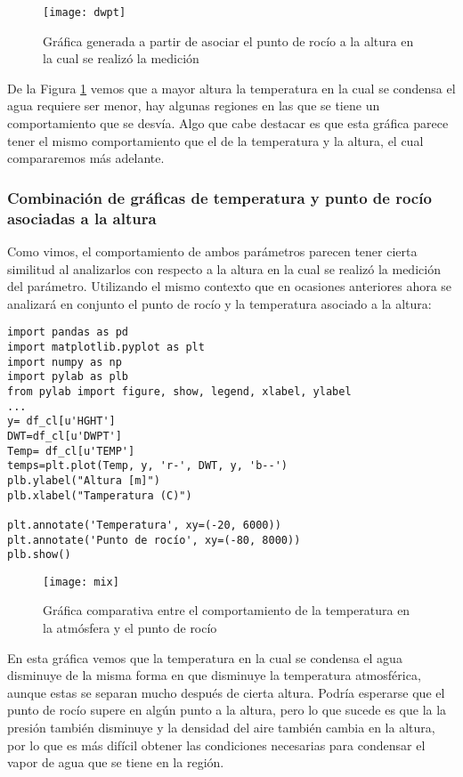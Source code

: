 \pagebreak

\begin{figure}[th]
\texttt{[image: dwpt]}
\caption{Gráfica generada a partir de asociar el punto de rocío a la altura en la cual se realizó la medición}
\label{dwp}
\end{figure}

De la Figura \ref{dwp} vemos que a mayor altura la temperatura en la cual se condensa el agua requiere ser menor, hay algunas regiones en las que se tiene un comportamiento que se desvía. Algo que cabe destacar es que esta gráfica parece tener el mismo comportamiento que el de la temperatura y la altura, el cual compararemos más adelante.
\newpage

\subsubsection{Combinación de gráficas de temperatura y punto de rocío asociadas a la altura}
\noindent Como vimos, el comportamiento de ambos parámetros parecen tener cierta similitud al analizarlos con respecto a la altura en la cual se realizó la medición del parámetro. Utilizando el mismo contexto que en ocasiones anteriores ahora se analizará en conjunto el punto de rocío y la temperatura asociado a la altura:

\begin{verbatim}
import pandas as pd
import matplotlib.pyplot as plt
import numpy as np
import pylab as plb
from pylab import figure, show, legend, xlabel, ylabel
...
y= df_cl[u'HGHT']
DWT=df_cl[u'DWPT']
Temp= df_cl[u'TEMP']
temps=plt.plot(Temp, y, 'r-', DWT, y, 'b--')
plb.ylabel("Altura [m]")
plb.xlabel("Tamperatura (C)")

plt.annotate('Temperatura', xy=(-20, 6000))
plt.annotate('Punto de rocío', xy=(-80, 8000))
plb.show() 
\end{verbatim}
\pagebreak
\begin{figure}[pth!]
\centering
\texttt{[image: mix]}
\caption{Gráfica comparativa entre el comportamiento de la temperatura en la atmósfera y el punto de rocío}
\end{figure}

En esta gráfica vemos que la temperatura en la cual se condensa el agua disminuye de la misma forma en que disminuye la temperatura atmosférica, aunque estas se separan mucho después de cierta altura. Podría esperarse que el punto de rocío supere en algún punto a la altura, pero lo que sucede es que la la presión también disminuye y la densidad del aire también cambia en la altura, por lo que es más difícil obtener las condiciones necesarias para condensar el vapor de agua que se tiene en la región.
\newpage

